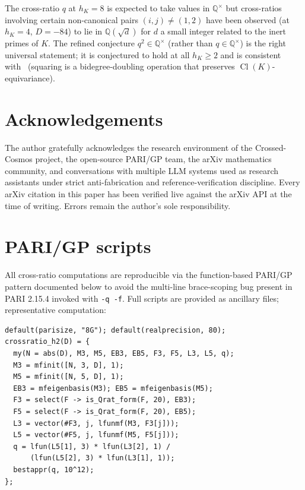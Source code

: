 \documentclass[11pt]{amsart}
\theoremstyle{definition}
\theoremstyle{remark}
\DeclareMathOperator{\Cl}{Cl}
\newcommand{\Q}{\mathbb{Q}}
\begin{document}
The cross-ratio $q$ at $h_K = 8$ is expected to take values in
$\Q^\times$ but cross-ratios involving certain non-canonical pairs
$(i, j) \neq (1, 2)$ have been observed (at $h_K = 4$, $D = -84$)
to lie in $\Q(\sqrt{d})$ for $d$ a small integer related to the
inert primes of $K$. The refined conjecture
$q^2 \in \Q^\times$ (rather than $q \in \Q^\times$) is the right
universal statement; it is conjectured to hold at all $h_K \geq 2$
and is consistent with~ (squaring is a bidegree-doubling
operation that preserves $\Cl(K)$-equivariance).

\section*{Acknowledgements}
The author gratefully acknowledges the research environment of the
Crossed-Cosmos project, the open-source PARI/GP team, the
arXiv mathematics community, and conversations with multiple
LLM systems used as research assistants
under strict anti-fabrication and reference-verification discipline.
Every arXiv citation in this paper has been verified live against
the arXiv API at the time of writing. Errors remain the author's
sole responsibility.

\appendix

\section{PARI/GP scripts}\label{appx:pari}
All cross-ratio computations are reproducible via the function-based
PARI/GP pattern documented below to avoid the multi-line brace-scoping
bug present in PARI 2.15.4 invoked with \texttt{-q -f}. Full scripts
are provided as ancillary files; representative computation:

\begin{verbatim}
default(parisize, "8G"); default(realprecision, 80);
crossratio_h2(D) = {
  my(N = abs(D), M3, M5, EB3, EB5, F3, F5, L3, L5, q);
  M3 = mfinit([N, 3, D], 1);
  M5 = mfinit([N, 5, D], 1);
  EB3 = mfeigenbasis(M3); EB5 = mfeigenbasis(M5);
  F3 = select(F -> is_Qrat_form(F, 20), EB3);
  F5 = select(F -> is_Qrat_form(F, 20), EB5);
  L3 = vector(#F3, j, lfunmf(M3, F3[j]));
  L5 = vector(#F5, j, lfunmf(M5, F5[j]));
  q = lfun(L5[1], 3) * lfun(L3[2], 1) /
      (lfun(L5[2], 3) * lfun(L3[1], 1));
  bestappr(q, 10^12);
};
\end{verbatim}
\end{document}
